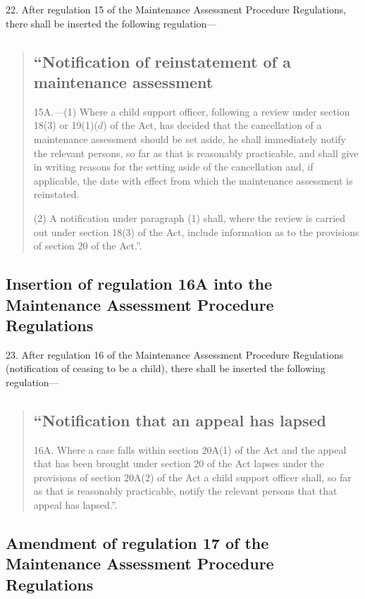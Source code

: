 \documentclass[a4paper]{article}
\begin{document}
22.  After regulation 15 of the Maintenance Assessment Procedure Regulations, there shall be inserted the following regulation—
\begin{quotation}
\subsection*{“Notification of reinstatement of a maintenance assessment}

15A.—(1) Where a child support officer, following a review under section 18(3) or 19(1)($d$) of the Act, has decided that the cancellation of a maintenance assessment should be set aside, he shall immediately notify the relevant persons, so far as that is reasonably practicable, and shall give in writing reasons for the setting aside of the cancellation and, if applicable, the date with effect from which the maintenance assessment is reinstated.

(2) A notification under paragraph (1) shall, where the review is carried out under section 18(3) of the Act, include information as to the provisions of section 20 of the Act.”.
\end{quotation}

\subsection[23. Insertion of regulation 16A into the Maintenance Assessment Procedure Regulations]{Insertion of regulation 16A into the Maintenance Assessment Procedure Regulations}

23.  After regulation 16 of the Maintenance Assessment Procedure Regulations (notification of ceasing to be a child), there shall be inserted the following regulation—
\begin{quotation}
\subsection*{“Notification that an appeal has lapsed}

16A.  Where a case falls within section 20A(1) of the Act and the appeal that has been brought under section 20 of the Act lapses under the provisions of section 20A(2) of the Act a child support officer shall, so far as that is reasonably practicable, notify the relevant persons that that appeal has lapsed.”.
\end{quotation}

\subsection[24. Amendment of regulation 17 of the Maintenance Assessment Procedure Regulations]{Amendment of regulation 17 of the Maintenance Assessment Procedure Regulations}
\end{document}
